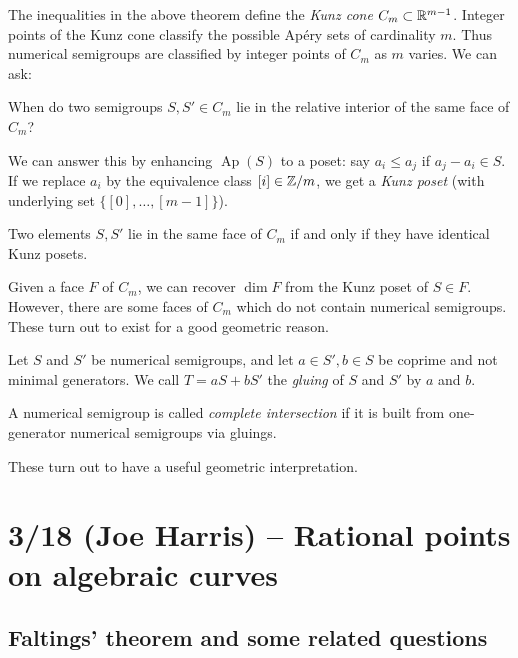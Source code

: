 \documentclass{article}
\begin{document}
The inequalities in the above theorem define the \emph{Kunz cone} $C_m \subset \mathbb{R}^{m-1}$.
Integer points of the Kunz cone classify the possible Ap\'ery sets of cardinality $m$.
Thus numerical semigroups are classified by integer points of $C_m$ as $m$ varies.
We can ask:

\begin{qn}
	When do two semigroups $S, S' \in C_m$ lie in the relative interior of the same face of $C_m$?
\end{qn}

We can answer this by enhancing $\operatorname{Ap}(S)$ to a poset: say $a_i \leq a_j$ if $a_j - a_i \in S$.
If we replace $a_i$ by the equivalence class $[i] \in \mathbb{Z}/m$, we get a \emph{Kunz poset} (with underlying set $\{[0], \dots, [m - 1]\}$).

\begin{thm}
	Two elements $S, S'$ lie in the same face of $C_m$ if and only if they have identical Kunz posets.
\end{thm}

Given a face $F$ of $C_m$, we can recover $\dim F$ from the Kunz poset of $S \in F$.
However, there are some faces of $C_m$ which do not contain numerical semigroups.
These turn out to exist for a good geometric reason.

\begin{dfn}
	Let $S$ and $S'$ be numerical semigroups, and let $a \in S', b \in S$ be coprime and not minimal generators.
	We call $T = aS + bS'$ the \emph{gluing} of $S$ and $S'$ by $a$ and $b$.
\end{dfn}

\begin{dfn}
	A numerical semigroup is called \emph{complete intersection} if it is built from one-generator numerical semigroups via gluings.
\end{dfn}

These turn out to have a useful geometric interpretation.

\section{3/18 (Joe Harris) -- Rational points on algebraic curves}

\subsection{Faltings' theorem and some related questions}
\end{document}
